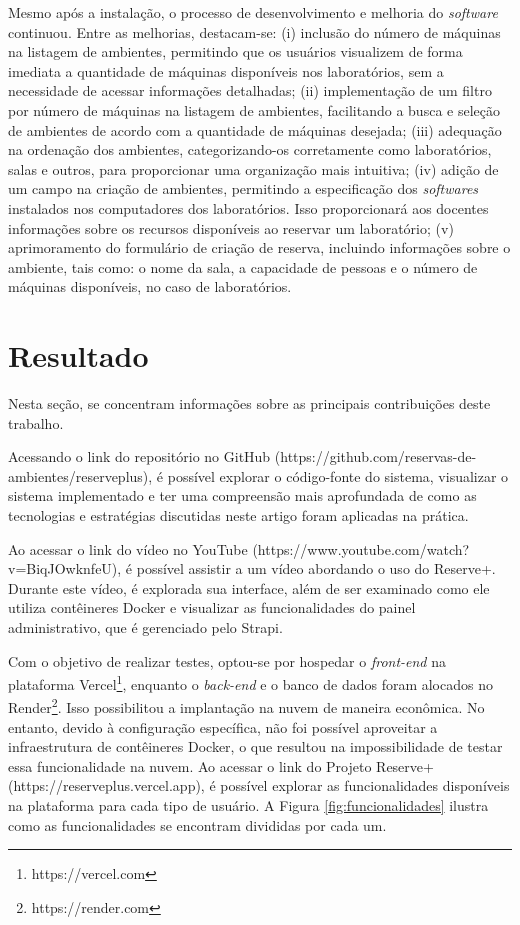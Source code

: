\documentclass[12pt]{article}
\begin{document}
Mesmo após a instalação, o processo de desenvolvimento e melhoria do \textit{software} continuou. Entre as melhorias, destacam-se: (i) inclusão do número de máquinas na listagem de ambientes, permitindo que os usuários visualizem de forma imediata a quantidade de máquinas disponíveis nos laboratórios, sem a necessidade de acessar informações detalhadas; (ii) implementação de um filtro por número de máquinas na listagem de ambientes, facilitando a busca e seleção de ambientes de acordo com a quantidade de máquinas desejada; (iii) adequação na ordenação dos ambientes, categorizando-os corretamente como laboratórios, salas e outros, para proporcionar uma organização mais intuitiva; (iv) adição de um campo na criação de ambientes, permitindo a especificação dos \textit{softwares} instalados nos computadores dos laboratórios. Isso proporcionará aos docentes informações sobre os recursos disponíveis ao reservar um laboratório; (v) aprimoramento do formulário de criação de reserva, incluindo informações sobre o ambiente, tais como: o nome da sala, a capacidade de pessoas e o número de máquinas disponíveis, no caso de laboratórios.

\section{Resultado} \label{sec:resultado_final}

Nesta seção, se concentram informações sobre as principais contribuições deste trabalho. 

Acessando o link do repositório no GitHub (https://github.com/reservas-de-ambientes/reserveplus), é possível explorar o código-fonte do sistema, visualizar o sistema implementado e ter uma compreensão mais aprofundada de como as tecnologias e estratégias discutidas neste artigo foram aplicadas na prática.

Ao acessar o link do vídeo no YouTube (https://www.youtube.com/watch?v=BiqJOwknfeU), é possível assistir a um vídeo abordando o uso do Reserve+. Durante este vídeo, é explorada sua interface, além de ser examinado como ele utiliza contêineres Docker e visualizar as funcionalidades do painel administrativo, que é gerenciado pelo Strapi.

Com o objetivo de realizar testes, optou-se por hospedar o \textit{front-end} na plataforma Vercel\footnote{https://vercel.com}, enquanto o \textit{back-end} e o banco de dados foram alocados no Render\footnote{https://render.com}. Isso possibilitou a implantação na nuvem de maneira econômica. No entanto, devido à configuração específica, não foi possível aproveitar a infraestrutura de contêineres Docker, o que resultou na impossibilidade de testar essa funcionalidade na nuvem. Ao acessar o link do Projeto Reserve+ (https://reserveplus.vercel.app), é possível explorar as funcionalidades disponíveis na plataforma para cada tipo de usuário. A Figura \ref{fig:funcionalidades} ilustra como as funcionalidades se encontram divididas por cada um.
\end{document}
